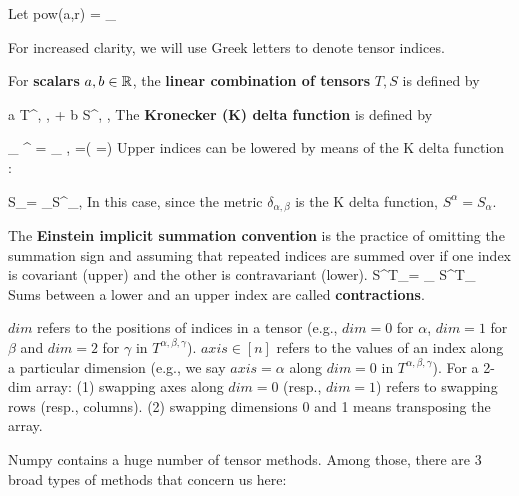 Let
\beq
pow(a,r) = \underbrace{[a, a, \ldots, a]}_{}
\eeq

For increased clarity, 
we will use Greek
letters to denote tensor indices.


For {\bf scalars} $a,b\in{ \mathbb{R}}$, the {\bf linear combination of tensors} $T, S$ is defined by



\rarrow a T^{\alpha, \beta, \gamma} + b S^{\alpha, \beta, \gamma}
\eeq
The {\bf Kronecker (K) delta function} is defined by

\beq
\delta_{
\alpha}^{\beta} = \delta_{
\alpha, \beta} =\indi(
\alpha=\beta)
\eeq
Upper indices can be lowered by means of the K delta function :

\beq
S_\beta = \sum_\alpha S^\alpha \delta_{\alpha,\beta}
\eeq
In this case, since the metric $\delta_{\alpha, \beta}$ is the K delta function, $S^{\alpha} =S_\alpha$.

The {\bf Einstein implicit summation convention} is the
practice of omitting the summation sign and assuming  that repeated indices are summed over if 
one index is covariant (upper)
and the other is contravariant (lower).
\beq
S^\alpha T_\alpha = \sum_\alpha 
S^\alpha T_\alpha
\eeq
Sums between a lower and an upper index are called {\bf contractions}.

$dim$
 refers to the positions
 of indices in a tensor (e.g., $dim=0$ for $\alpha$, $dim=1$ for $\beta$ and 
 $dim=2$ for $\gamma$ in $T^{\alpha, \beta, \gamma}$).
$axis\in [n]$ 
refers to the values of an index  along a
particular dimension
(e.g., we say $axis=\alpha$ along $dim=0$ in $T^{\alpha, \beta, \gamma}$). 
 For a 2-dim array: (1)
  swapping axes along $dim=0$ (resp., $dim=1$) refers 
 to swapping rows
 (resp., columns).
 (2)
 swapping dimensions 0 and 1 means transposing the array.


Numpy contains a huge number of tensor methods.
Among those, there are 3 broad types of methods that concern us here:

